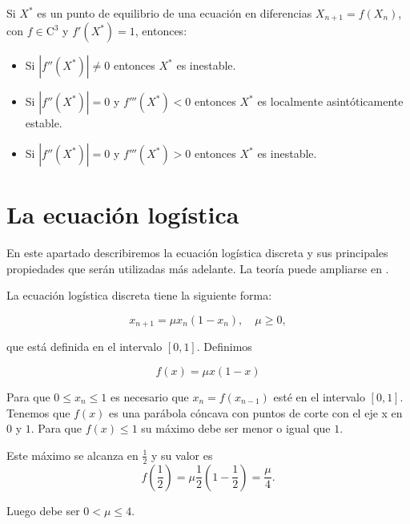 \begin{proposition}
Si $X^*$ es un punto de equilibrio de una ecuación en diferencias $X_{n+1}=f(X_n)$, con $f\in\text{C}^3$ y $f'(X^*)=1$, entonces:
\begin{itemize}
\item Si $|f''(X^*)|\neq 0$ entonces $X^*$ es inestable.
\item Si $|f''(X^*)|=0$ y $f'''(X^*)<0$ entonces $X^*$ es localmente asintóticamente estable.
\item Si $|f''(X^*)|=0$ y $f'''(X^*)>0$ entonces $X^*$ es inestable.
\end{itemize}
\end{proposition}



\section{La ecuación logística}

En este apartado describiremos la ecuación logística discreta y sus principales propiedades que serán utilizadas más adelante. La teoría puede ampliarse en \cite{strogatzNonlinearDynamicsChaos1994}.

\begin{definition}
La ecuación logística discreta tiene la siguiente forma:

$$x_{n+1} = \mu x_n(1-x_n),\quad \mu \geq 0,$$

que está definida en el intervalo $ [ 0, 1 ] $. Definimos

$$f(x)=\mu x(1-x)$$

Para que $0\leq x_n\leq 1$ es necesario que $x_n=f(x_{n-1})$ esté en el intervalo $[0,1]$. Tenemos que $f(x)$ es una parábola cóncava con puntos de corte con el eje x en $0$ y $1$. Para que $f(x)\leq 1$ su máximo debe ser menor o igual que $1$.

Este máximo se alcanza en $\frac{1}{2}$ y su valor es
$$f\left(\frac{1}{2}\right) = \mu \frac{1}{2}\left(1-\frac{1}{2}\right) = \frac{\mu}{4}.$$

Luego debe ser $0< \mu \leq 4$.

\end{definition}


